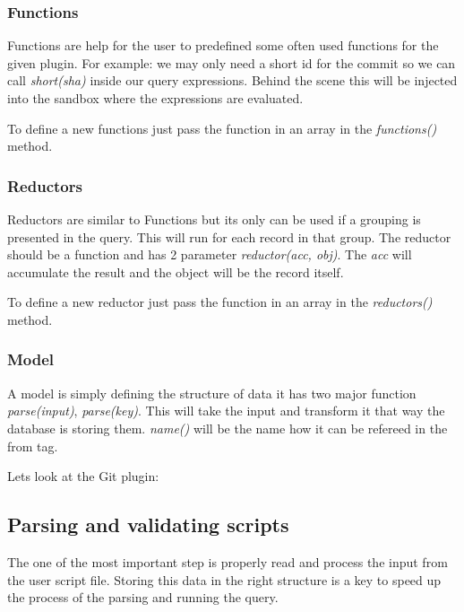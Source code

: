 \subsubsection{Functions}

Functions are help for the user to predefined some often used functions for the given plugin.
For example: we may only need a short id for the commit so we can call \textit{short(sha)} inside our query expressions.
Behind the scene this will be injected into the sandbox where the expressions are evaluated.

To define a new functions just pass the function in an array in the \textit{functions()} method.

\subsubsection{Reductors}

Reductors are similar to Functions but its only can be used if a grouping is presented in the query. This will
run for each record in that group. The reductor should be a function and has 2 parameter \textit{reductor(acc, obj)}.
The \textit{acc} will accumulate the result and the object will be the record itself.

To define a new reductor just pass the function in an array in the \textit{reductors()} method.

\subsubsection{Model}

A model is simply defining the structure of data it has two major function \textit{parse(input)}, \textit{parse(key)}. 
This will take the input and transform it that way the database is storing them. 
\textit{name()} will be the name how it can be refereed in the from tag.

Lets look at the Git plugin:



\subsection{Parsing and validating scripts}

The one of the most important step is properly read and process the input
from the user script file. Storing this data in the right structure is a key
to speed up the process of the parsing and running the query.

